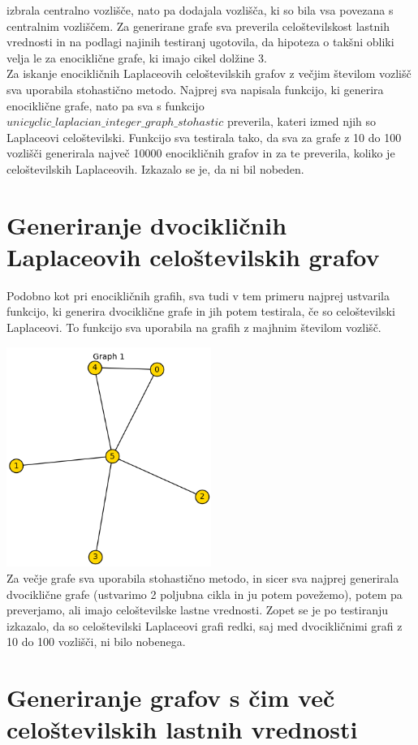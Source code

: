 \documentclass{article}
\begin{document}
izbrala centralno vozlišče, nato pa dodajala vozlišča, ki so bila vsa povezana s centralnim vozliščem. Za generirane grafe sva preverila celoštevilskost lastnih vrednosti in 
na podlagi najinih testiranj ugotovila, da hipoteza o takšni obliki velja le za enociklične grafe, ki imajo cikel dolžine 3. \\
Za iskanje enocikličnih Laplaceovih celoštevilskih grafov z večjim številom vozlišč sva uporabila stohastično metodo. Najprej sva napisala funkcijo,
ki generira enociklične grafe, nato pa sva s funkcijo $unicyclic\_laplacian\_integer\_graph\_stohastic$ preverila, kateri izmed njih so Laplaceovi celoštevilski. 
Funkcijo sva testirala tako, da sva za grafe z 10 do 100 vozlišči generirala največ 10000 enocikličnih grafov in za te preverila, koliko je celoštevilskih Laplaceovih.
Izkazalo se je, da ni bil nobeden.

\section{Generiranje dvocikličnih Laplaceovih celoštevilskih grafov}
Podobno kot pri enocikličnih grafih, sva tudi v tem primeru najprej ustvarila funkcijo, ki generira dvociklične grafe in jih potem testirala, če so celoštevilski 
Laplaceovi. To funkcijo sva uporabila na grafih z majhnim številom vozlišč. 

\includegraphics[width=0.5\textwidth]{primer_6.png} \\
Za večje grafe sva uporabila stohastično metodo, in sicer sva najprej generirala dvociklične grafe (ustvarimo
2 poljubna cikla in ju potem povežemo), potem pa preverjamo, ali imajo celoštevilske lastne vrednosti. Zopet se je po testiranju izkazalo, da so celoštevilski
Laplaceovi grafi redki, saj med dvocikličnimi grafi z 10 do 100 vozlišči, ni bilo nobenega.

\section{Generiranje grafov s čim več celoštevilskih lastnih vrednosti}
\end{document}
